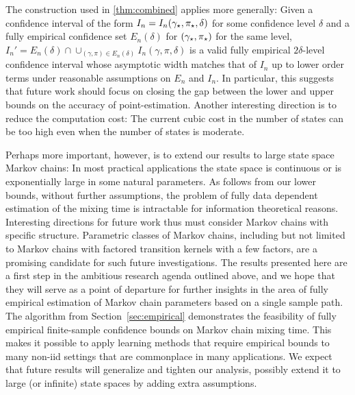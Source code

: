 The construction used in \cref{thm:combined} applies more generally:
Given a confidence interval of the form $I_n = I_n(\gamma_{\star},\pi_{\star},\delta)$ 
for some confidence level $\delta$
and a fully empirical confidence set $E_n(\delta)$ for $(\gamma_{\star},\pi_{\star})$  for the same level,
$I_n' = E_n(\delta) \cap \cup_{(\gamma,\pi)\in E_n(\delta)} I_n(\gamma,\pi,\delta)$ is a valid
fully empirical $2\delta$-level confidence interval whose asymptotic width
matches that of $I_n$ up to lower order terms under reasonable assumptions on $E_n$ and $I_n$.
 
In particular, this suggests that future work should focus on 
closing the gap between the lower and upper bounds on the accuracy
of point-estimation. Another interesting direction is to 
reduce the computation cost: The current cubic cost in the number of states
can be too high even when the number of states is moderate.

Perhaps more important, however, is to extend 
our results to large state space Markov chains:
In most practical applications the state space is continuous
or is exponentially large in some natural parameters.
As follows from our lower bounds, without further assumptions,
the problem of fully data dependent estimation of the mixing time
is intractable for information theoretical reasons.
Interesting directions for future work thus must consider Markov
chains with specific structure. Parametric classes of Markov chains,
including but not limited to Markov chains with factored transition kernels
with a few factors, are a promising candidate for such future investigations.
The results presented here are a first step in the ambitious research agenda
outlined above, and we hope that they will
serve as a point of departure
for
further insights
in the area of fully empirical estimation of Markov chain 
parameters based on a single sample path.
The algorithm from Section~\ref{sec:empirical} demonstrates the
feasibility of fully empirical finite-sample confidence bounds on
Markov chain mixing time.
This makes it possible to apply learning methods that require
empirical bounds to many non-iid settings that are commonplace in many
applications.
We expect that future results will generalize and tighten our
analysis, possibly extend it to large (or infinite) state spaces by
adding extra assumptions.

